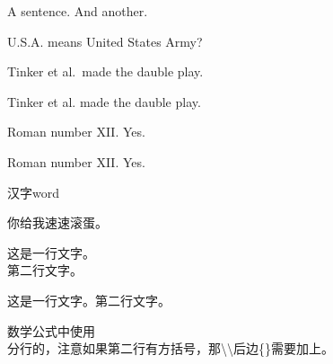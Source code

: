 \documentclass{article}
\begin{document}
	
	A sentence. And another.
	
	U.S.A. means United States Army?
	
	Tinker et al.\ made the dauble play. %
	
	Tinker et al. made the dauble play.  %
	
	Roman number XII\@. Yes.%
	
	Roman number XII. Yes.%
	
	汉字word
	
	
	你给我\phantom{参数党啊啊手动阀}速速滚蛋。%
	\hphantom \vphantom
	
	
	这是一行文字。\\第二行文字。
	
	这是一行文字。\linebreak 第二行文字。%
	
	
	数学公式中使用\\分行的，注意如果第二行有方括号，那\textbackslash \textbackslash 后边\{\}需要加上。
	
\end{document}
